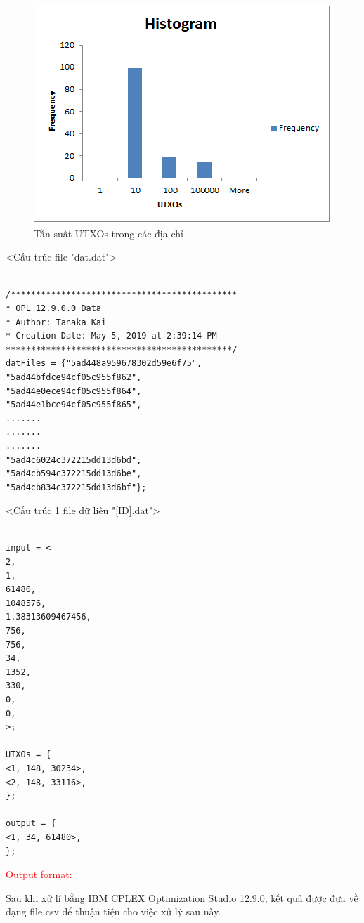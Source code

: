 \documentclass[a4paper]{article}
\begin{document}
\newpage
\begin{center}
	\begin{figure} []
		\begin{center}
			\includegraphics[scale=1]{tansuatUTXOs}
		\end{center}
		\caption{Tần suất UTXOs trong các địa chỉ}
		\label{refhinh1}
	\end{figure}
\end{center}

<Cấu trúc file "dat.dat">
\begin{lstlisting}[frame=single]

/*********************************************
* OPL 12.9.0.0 Data
* Author: Tanaka Kai
* Creation Date: May 5, 2019 at 2:39:14 PM
*********************************************/
datFiles = {"5ad448a959678302d59e6f75",
"5ad44bfdce94cf05c955f862",
"5ad44e0ece94cf05c955f864",
"5ad44e1bce94cf05c955f865",
.......
.......
.......			
"5ad4c6024c372215dd13d6bd",
"5ad4cb594c372215dd13d6be",
"5ad4cb834c372215dd13d6bf"};

\end{lstlisting}


<Cấu trúc 1 file dữ liêu "[ID].dat">
\begin{lstlisting}[frame=single]

input = <
2, 
1, 
61480, 
1048576, 
1.38313609467456, 
756, 
756, 
34, 
1352, 
330, 
0, 
0, 
>;

UTXOs = { 
<1, 148, 30234>, 
<2, 148, 33116>, 
};

output = { 
<1, 34, 61480>, 
};

\end{lstlisting}

\textcolor{red}{Output format:}

Sau khi xử lí bằng IBM CPLEX Optimization Studio 12.9.0, kết quả được đưa về dạng file csv để thuận tiện cho việc xử lý sau này.
\end{document}

